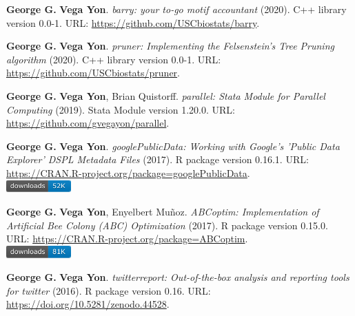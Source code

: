 \item \textbf{George G.} \textbf{Vega Yon}. \textit{barry: your to-go motif accountant} (2020). C++ library version 0.0-1. {\small URL}: \url{https://github.com/USCbiostats/barry}.  
\item \textbf{George G.} \textbf{Vega Yon}. \textit{pruner: Implementing the Felsenstein's Tree Pruning algorithm} (2020). C++ library version 0.0-1. {\small URL}: \url{https://github.com/USCbiostats/pruner}.  
\item \textbf{George G.} \textbf{Vega Yon}, Brian Quistorff. \textit{parallel: Stata Module for Parallel Computing} (2019). Stata Module version 1.20.0. {\small URL}: \url{https://github.com/gvegayon/parallel}.  
\item \textbf{George G.} \textbf{Vega Yon}. \textit{googlePublicData: Working with Google's 'Public Data Explorer' DSPL Metadata Files} (2017). R package version 0.16.1. {\small URL}: \url{https://CRAN.R-project.org/package=googlePublicData}. \\\includegraphics[width=2.5cm]{fig/cran-downloads-googlepublicdata.pdf} 
\item \textbf{George G.} \textbf{Vega Yon}, Enyelbert Muñoz. \textit{ABCoptim: Implementation of Artificial Bee Colony (ABC) Optimization} (2017). R package version 0.15.0. {\small URL}: \url{https://CRAN.R-project.org/package=ABCoptim}. \\\includegraphics[width=2.5cm]{fig/cran-downloads-abcoptim.pdf} 
\item \textbf{George G.} \textbf{Vega Yon}. \textit{{twitterreport: Out-of-the-box analysis and 
	reporting tools for twitter}} (2016). R package version 0.16. {\small URL}: \url{https://doi.org/10.5281/zenodo.44528}.  
